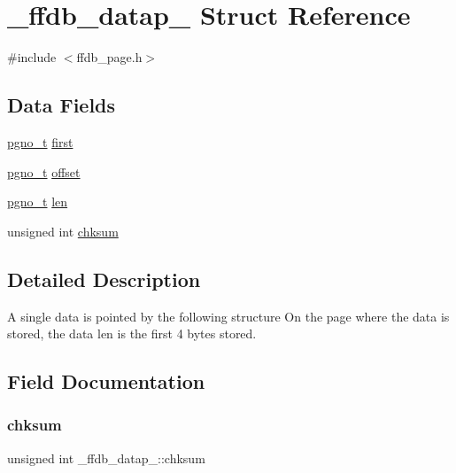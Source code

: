 \hypertarget{struct__ffdb__datap__}{}\section{\+\_\+ffdb\+\_\+datap\+\_\+ Struct Reference}
\label{struct__ffdb__datap__}


{\ttfamily \#include $<$ffdb\+\_\+page.\+h$>$}

\subsection*{Data Fields}
\begin{DoxyCompactItemize}
\item 
\mbox{\hyperlink{other__libs_2filedb_2filehash_2ffdb__db_8h_a000813331643d38481142bcce7de1501}{pgno\+\_\+t}} \mbox{\hyperlink{struct__ffdb__datap___a45bb4391f88d605103aaf0f61a10f349}{first}}
\item 
\mbox{\hyperlink{other__libs_2filedb_2filehash_2ffdb__db_8h_a000813331643d38481142bcce7de1501}{pgno\+\_\+t}} \mbox{\hyperlink{struct__ffdb__datap___a27c6fdcb05f89592016f8f8cc141560a}{offset}}
\item 
\mbox{\hyperlink{other__libs_2filedb_2filehash_2ffdb__db_8h_a000813331643d38481142bcce7de1501}{pgno\+\_\+t}} \mbox{\hyperlink{struct__ffdb__datap___aec2dc3a3454339039f0c12598e3faad7}{len}}
\item 
unsigned int \mbox{\hyperlink{struct__ffdb__datap___a69c8dca32c4bb1d91f0fff9409c0a13f}{chksum}}
\end{DoxyCompactItemize}


\subsection{Detailed Description}
A single data is pointed by the following structure On the page where the data is stored, the data len is the first 4 bytes stored. 

\subsection{Field Documentation}
\mbox{\label{struct__ffdb__datap___a69c8dca32c4bb1d91f0fff9409c0a13f}} 
\subsubsection{\texorpdfstring{chksum}{chksum}}
{\footnotesize\ttfamily unsigned int \+\_\+ffdb\+\_\+datap\+\_\+\+::chksum}

